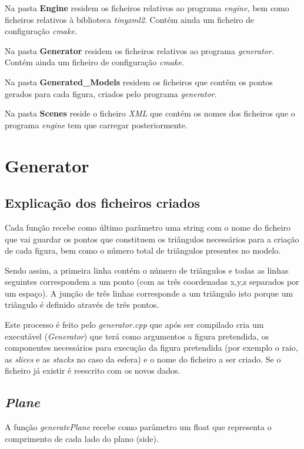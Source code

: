 \documentclass[a4paper]{article}
\begin{document}
Na pasta \textbf{Engine} residem os ficheiros relativos ao programa \emph{engine}, bem como ficheiros relativos à biblioteca \emph{tinyxml2}. Contém ainda um ficheiro de configuração \emph{cmake}.

Na pasta \textbf{Generator} residem os ficheiros relativos ao programa \emph{generator}. Contém ainda um ficheiro de configuração \emph{cmake}.

Na pasta \textbf{Generated\_Models} residem os ficheiros que contêm os pontos gerados para cada figura, criados pelo programa \emph{generator}.

Na pasta \textbf{Scenes} reside o ficheiro \emph{XML} que contém os nomes dos ficheiros que o programa \emph{engine} tem que carregar posteriormente.


\newpage

\section{Generator}
\label{sec:generator}

\subsection{Explicação dos ficheiros criados}
\label{sec:ficheiros}

Cada função recebe como último parâmetro uma string com o nome do ficheiro que vai guardar os pontos que constituem os triângulos necessários para a criação de cada figura, bem como o número total de triângulos presentes no modelo.

Sendo assim, a primeira linha contém o número de triângulos e todas as linhas seguintes correspondem a um ponto (com as três coordenadas x,y,z separados por um espaço). A junção de três linhas corresponde a um triângulo isto porque um triângulo é definido através de três pontos.

Este processo é feito pelo \textit{generator.cpp} que após ser compilado cria um executável (\textit{Generator}) que terá como argumentos a figura pretendida, os componentes necessários para execução da figura pretendida (por exemplo o raio, as \textit{slices} e as \textit{stacks} no caso da esfera) e o nome do ficheiro a ser criado. Se o ficheiro já existir é reescrito com os novos dados.


\newpage

\subsection{\textit{Plane}}
\label{sec:plane}
A função \textit{generatePlane} recebe como parâmetro um float que representa o comprimento de cada lado do plano (side).
\end{document}

